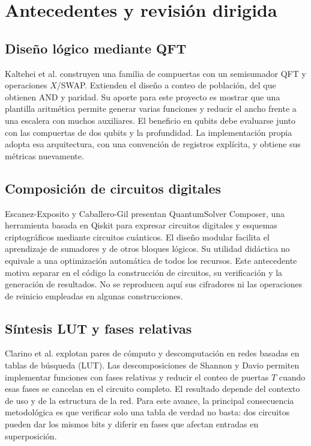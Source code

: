 \documentclass[10pt,a4paper,twocolumn]{article}
\begin{document}
\section{Antecedentes y revisión dirigida}
\subsection{Diseño lógico mediante QFT}
Kaltehei et al. \cite{kaltehei2026} construyen una familia de compuertas con
un semisumador QFT y operaciones $X$/SWAP. Extienden el diseño a conteo de
población, del que obtienen AND y paridad. Su aporte para este proyecto es
mostrar que una plantilla aritmética permite generar varias funciones y
reducir el ancho frente a una escalera con muchos auxiliares. El beneficio en
qubits debe evaluarse junto con las compuertas de dos qubits y la profundidad.
La implementación propia adopta esa arquitectura, con una convención de
registros explícita, y obtiene sus métricas nuevamente.

\subsection{Composición de circuitos digitales}
Escanez-Exposito y Caballero-Gil \cite{escanez2026} presentan QuantumSolver
Composer, una herramienta basada en Qiskit para expresar circuitos digitales
y esquemas criptográficos mediante circuitos cuánticos. El diseño modular
facilita el aprendizaje de sumadores y de otros bloques lógicos. Su utilidad
didáctica no equivale a una optimización automática de todos los recursos.
Este antecedente motiva separar en el código la construcción de circuitos,
su verificación y la generación de resultados. No se reproducen aquí sus
cifradores ni las operaciones de reinicio empleadas en algunas construcciones.

\subsection{Síntesis LUT y fases relativas}
Clarino et al. \cite{clarino2025} explotan pares de cómputo y descomputación
en redes basadas en tablas de búsqueda (LUT). Las descomposiciones de Shannon
y Davio permiten implementar funciones con fases relativas y reducir el
conteo de puertas $T$ cuando esas fases se cancelan en el circuito completo.
El resultado depende del contexto de uso y de la estructura de la red.
Para este avance, la principal consecuencia metodológica es que verificar
solo una tabla de verdad no basta: dos circuitos pueden dar los mismos bits
y diferir en fases que afectan entradas en superposición.
\end{document}
